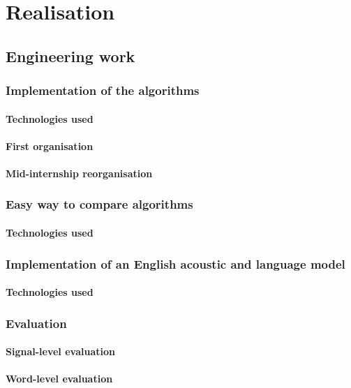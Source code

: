 \section{Realisation}
\subsection{Engineering work}
\subsubsection{Implementation of the algorithms}
\paragraph{Technologies used}
\paragraph{First organisation}
\paragraph{Mid-internship reorganisation}

\subsubsection{Easy way to compare algorithms}
\paragraph{Technologies used}
\subsubsection{Implementation of an English acoustic and language model}
\paragraph{Technologies used}
\subsubsection{Evaluation}
\paragraph{Signal-level evaluation}
\paragraph{Word-level evaluation}
